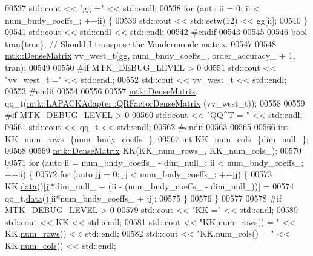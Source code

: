 \begin{DoxyCode}
{{00537   std::cout << \textcolor{stringliteral}{"gg ="} << std::endl;
00538   \textcolor{keywordflow}{for} (\textcolor{keyword}{auto} ii = 0; ii < num\_bndy\_coeffs\_; ++ii) \{
00539     std::cout << std::setw(12) << gg[ii];
00540   \}
00541   std::cout << std::endl << std::endl;
00542 \textcolor{preprocessor}{  #endif}
00543 
00545 
00546   \textcolor{keywordtype}{bool} tran\{\textcolor{keyword}{true}\}; \textcolor{comment}{// Should I transpose the Vandermonde matrix.}
00547 
00548   \hyperlink{classmtk_1_1DenseMatrix}{mtk::DenseMatrix} vv\_west\_t(gg, num\_bndy\_coeffs\_, order\_accuracy\_ + 1, tran);
00549 
00550 \textcolor{preprocessor}{  #if MTK\_DEBUG\_LEVEL > 0}
00551   std::cout << \textcolor{stringliteral}{"vv\_west\_t ="} << std::endl;
00552   std::cout << vv\_west\_t << std::endl;
00553 \textcolor{preprocessor}{  #endif}
00554 
00556 
00557   \hyperlink{classmtk_1_1DenseMatrix}{mtk::DenseMatrix} qq\_t(\hyperlink{classmtk_1_1LAPACKAdapter_ae5c6e78c9c819c9ac7a6f31bfd011d7a}{mtk::LAPACKAdapter::QRFactorDenseMatrix}
      (vv\_west\_t));
00558 
00559 \textcolor{preprocessor}{  #if MTK\_DEBUG\_LEVEL > 0}
00560   std::cout << \textcolor{stringliteral}{"QQ^T = "} << std::endl;
00561   std::cout << qq\_t << std::endl;
00562 \textcolor{preprocessor}{  #endif}
00563 
00565 
00566   \textcolor{keywordtype}{int} KK\_num\_rows\_\{num\_bndy\_coeffs\_\};
00567   \textcolor{keywordtype}{int} KK\_num\_cols\_\{dim\_null\_\};
00568 
00569   \hyperlink{classmtk_1_1DenseMatrix}{mtk::DenseMatrix} KK(KK\_num\_rows\_, KK\_num\_cols\_);
00570 
00571   \textcolor{keywordflow}{for} (\textcolor{keyword}{auto} ii = num\_bndy\_coeffs\_ - dim\_null\_; ii < num\_bndy\_coeffs\_; ++ii) \{
00572     \textcolor{keywordflow}{for} (\textcolor{keyword}{auto} jj = 0; jj < num\_bndy\_coeffs\_; ++jj) \{
00573       KK.\hyperlink{classmtk_1_1DenseMatrix_a16b3ff56feb2658b9fc7147d1de4d8e7}{data}()[jj*dim\_null\_ + (ii - (num\_bndy\_coeffs\_ - dim\_null\_))] =
00574           qq\_t.\hyperlink{classmtk_1_1DenseMatrix_a16b3ff56feb2658b9fc7147d1de4d8e7}{data}()[ii*num\_bndy\_coeffs\_ + jj];
00575     \}
00576   \}
00577 
00578 \textcolor{preprocessor}{  #if MTK\_DEBUG\_LEVEL > 0}
00579   std::cout << \textcolor{stringliteral}{"KK ="} << std::endl;
00580   std::cout << KK << std::endl;
00581   std::cout << \textcolor{stringliteral}{"KK.num\_rows() = "} << KK.\hyperlink{classmtk_1_1DenseMatrix_a17d8d3b9cc0926044b6972dd190a5c21}{num\_rows}() << std::endl;
00582   std::cout << \textcolor{stringliteral}{"KK.num\_cols() = "} << KK.\hyperlink{classmtk_1_1DenseMatrix_af6f78373aaf2136f0c78974d7c8de0a8}{num\_cols}() << std::endl;
}}
\end{DoxyCode}
